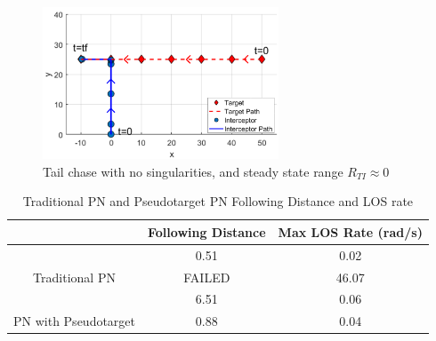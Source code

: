 \documentclass[conference]{IEEEtran}
\begin{document}
\begin{figure}[H]
	\centering
	\includegraphics[width=7cm] {fixedSingularity}
	\caption{Tail chase with no singularities, and steady state range $R_{TI}\approx0$}
	\label{fig:modifiedPNsuccessLOS}
	\hspace*{0mm}
\end{figure}



\begin{table}[H]
	\centering
	\caption{Traditional PN and Pseudotarget PN Following Distance and LOS rate}
	\label{my-label}
	\begin{tabular}{c|c|c|}
		\cline{2-3}
		\multicolumn{1}{l|}{}                                        & \multicolumn{1}{l|}{Following Distance} & \multicolumn{1}{l|}{Max LOS Rate (rad/s)} \\ \hline
		\multicolumn{1}{|c|}{}                                       & 0.51                                    & 0.02                                      \\ \cline{2-3} 
		\multicolumn{1}{|c|}{\multirow{-2}{*}{Traditional PN}}       & \cellcolor[HTML]{C0C0C0} FAILED         & 46.07                                     \\ \hline
		\multicolumn{1}{|c|}{}                                       & 6.51                                    & 0.06                                      \\ \cline{2-3} 
		\multicolumn{1}{|c|}{\multirow{-2}{*}{PN with Pseudotarget}} & 0.88                                    & 0.04                                      \\ \hline
	\end{tabular}
\end{table}
\end{document}
